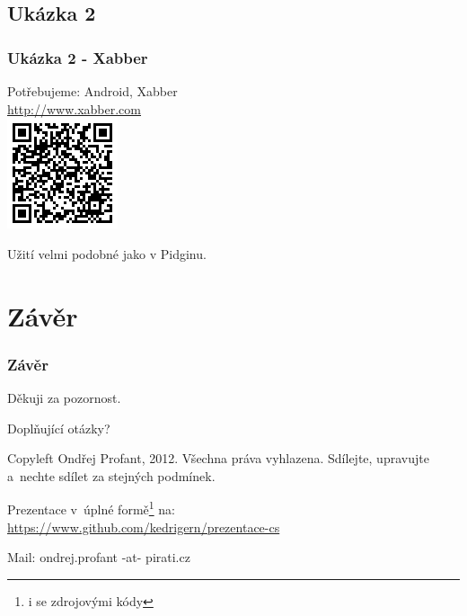 \documentclass[xetex]{beamer}
\begin{document}
\subsection{Ukázka 2}
\begin{frame}
	\frametitle{Ukázka 2 - Xabber}
	Potřebujeme: Android, Xabber\\
	\url{http://www.xabber.com}\\
	\includegraphics{pic/xabber-android.png}

	Užití velmi podobné jako v Pidginu. 
\end{frame}


\section{Závěr}

\begin{frame}
  \frametitle{Závěr}
	Děkuji za pozornost.

	\bigskip
	
	Doplňující otázky?

	\bigskip

	\bigskip

	\scriptsize
	Copyleft Ondřej Profant, 2012. Všechna práva vyhlazena. Sdílejte, upravujte a~nechte sdílet za stejných podmínek. 

	\bigskip

	Prezentace v~úplné formě\footnote{i se zdrojovými kódy} na:\\ 
	\url{https://www.github.com/kedrigern/prezentace-cs}

	\bigskip

	Mail: ondrej.profant -at- pirati.cz 
\end{frame}
\end{document}
